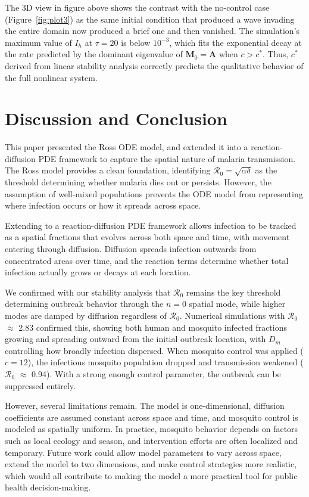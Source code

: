 \documentclass[12pt]{article}
\begin{document}
The 3D view in figure above shows the contrast with the no-control case (Figure~\ref{fig:plot3}) as the same initial condition that produced a wave invading the entire domain now produced a brief one and then vanished. The simulation's maximum value of $I_h$ at $\tau = 20$ is below $10^{-3}$, which fits the exponential decay at the rate predicted by the dominant eigenvalue of $\mathbf{M}_0 = \mathbf{A}$ when $c > c^\ast$. Thus, $c^\ast$ derived from linear stability analysis correctly predicts the qualitative behavior of the full nonlinear system. 

\section{Discussion and Conclusion}

This paper presented the Ross ODE model, and extended it into a reaction-diffusion PDE framework to capture the spatial nature of malaria transmission. The Ross model provides a clean foundation, identifying $\mathcal{R}_0 = \sqrt{\alpha\delta}$ as the threshold determining whether malaria dies out or persists. However, the assumption of well-mixed populations prevents the ODE model from representing where infection occurs or how it spreads across space.

Extending to a reaction-diffusion PDE framework allows infection to be tracked as a spatial fractions that evolves across both space and time, with movement entering through diffusion. Diffusion spreads infection outwards from concentrated areas over time, and the reaction terms determine whether total infection actually grows or decays at each location. 

We confirmed with our stability analysis that $\mathcal{R}_0$ remains the key threshold determining outbreak behavior through the $n = 0$ spatial mode, while higher modes are damped by diffusion regardless of $\mathcal{R}_0$. Numerical simulations with $\mathcal{R}_0$ $\approx$ 2.83 confirmed this, showing both human and mosquito infected fractions growing and spreading outward from the initial outbreak location, with $D_m$ controlling how broadly infection dispersed. When mosquito control was applied ($c = 12$), the infectious mosquito population dropped and transmission weakened ($\mathcal{R}_0$ $\approx$ 0.94). With a strong enough control parameter, the outbreak can be suppressed entirely.

However, several limitations remain. The model is one-dimensional, diffusion coefficients are assumed constant across space and time, and mosquito control is modeled as spatially uniform. In practice, mosquito behavior depends on factors such as local ecology and season, and intervention efforts are often localized and temporary. Future work could allow model parameters to vary across space, extend the model to two dimensions, and make control strategies more realistic, which would all contribute to making the model a more practical tool for public health decision-making.
\end{document}
